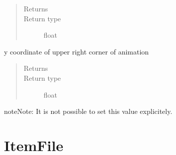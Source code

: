 \documentclass[letterpaper,10pt,english]{sphinxmanual}
\begin{document}
\begin{fulllineitems}
\begin{fulllineitems}
\begin{quote}
\begin{description}
\item[{Returns}] \leavevmode
{}

\item[{Return type}] \leavevmode
float

\end{description}\end{quote}

\end{fulllineitems}


\begin{fulllineitems}
\label{\detokenize{Reference:salabim.Environment.y1}}
y coordinate of upper right corner of animation
\begin{quote}\begin{description}
\item[{Returns}] \leavevmode
{}

\item[{Return type}] \leavevmode
float

\end{description}\end{quote}

\begin{sphinxadmonition}{note}{Note:}
It is not possible to set this value explicitely.
\end{sphinxadmonition}

\end{fulllineitems}


\end{fulllineitems}



\section{ItemFile}
\label{\detokenize{Reference:itemfile}}
\end{document}
